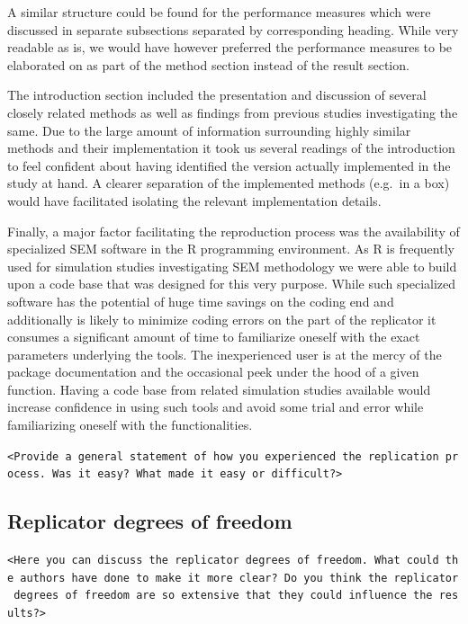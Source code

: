 \documentclass[10,a4paperpaper,]{article}
\begin{document}
A similar structure could be found for the performance measures which
were discussed in separate subsections separated by corresponding
heading. While very readable as is, we would have however preferred the
performance measures to be elaborated on as part of the method section
instead of the result section.

The introduction section included the presentation and discussion of
several closely related methods as well as findings from previous
studies investigating the same. Due to the large amount of information
surrounding highly similar methods and their implementation it took us
several readings of the introduction to feel confident about having
identified the version actually implemented in the study at hand. A
clearer separation of the implemented methods (e.g.~in a box) would have
facilitated isolating the relevant implementation details.

Finally, a major factor facilitating the reproduction process was the
availability of specialized SEM software in the R programming
environment. As R is frequently used for simulation studies
investigating SEM methodology we were able to build upon a code base
that was designed for this very purpose. While such specialized software
has the potential of huge time savings on the coding end and
additionally is likely to minimize coding errors on the part of the
replicator it consumes a significant amount of time to familiarize
oneself with the exact parameters underlying the tools. The
inexperienced user is at the mercy of the package documentation and the
occasional peek under the hood of a given function. Having a code base
from related simulation studies available would increase confidence in
using such tools and avoid some trial and error while familiarizing
oneself with the functionalities.

\texttt{\textless{}Provide\ a\ general\ statement\ of\ how\ you\ experienced\ the\ replication\ process.\ Was\ it\ easy?\ What\ made\ it\ easy\ or\ difficult?\textgreater{}}

\subsection{Replicator degrees of freedom}

\texttt{\textless{}Here\ you\ can\ discuss\ the\ replicator\ degrees\ of\ freedom.\ What\ could\ the\ authors\ have\ done\ to\ make\ it\ more\ clear?\ Do\ you\ think\ the\ replicator\ degrees\ of\ freedom\ are\ so\ extensive\ that\ they\ could\ influence\ the\ results?\textgreater{}}
\end{document}
